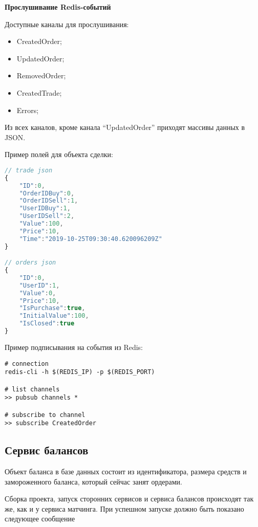\textbf{Прослушивание Redis-событий}

Доступные каналы для прослушивания:

\begin{itemize}
    \item CreatedOrder;
    \item UpdatedOrder;
    \item RemovedOrder;
    \item CreatedTrade;
    \item Errors;
\end{itemize}

Из всех каналов, кроме канала ``UpdatedOrder'' приходят массивы данных в JSON.

Пример полей для объекта сделки:

\begin{lstlisting}[language=JavaScript]
// trade json
{
    "ID":0,
    "OrderIDBuy":0,
    "OrderIDSell":1,
    "UserIDBuy":1,
    "UserIDSell":2,
    "Value":100,
    "Price":10,
    "Time":"2019-10-25T09:30:40.620096209Z"
}

// orders json
{
    "ID":0,
    "UserID":1,
    "Value":0,
    "Price":10,
    "IsPurchase":true,
    "InitialValue":100,
    "IsClosed":true
}
\end{lstlisting}

Пример подписывания на события из Redis:

\begin{lstlisting}
# connection
redis-cli -h $(REDIS_IP) -p $(REDIS_PORT)

# list channels
>> pubsub channels *

# subscribe to channel
>> subscribe CreatedOrder
\end{lstlisting}

\subsection{Сервис балансов}

Объект баланса в базе данных состоит из идентификатора, размера средств и замороженного баланса, который сейчас занят ордерами.

Сборка проекта, запуск сторонних сервисов и сервиса балансов происходят так же, как и у сервиса матчинга.
При успешном запуске должно быть показано следующее сообщение

